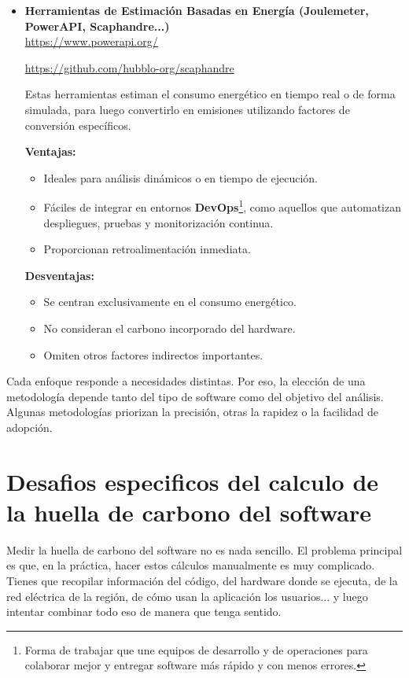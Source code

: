 \documentclass[12pt,a4paper]{report}
\begin{document}
\begin{itemize}
        \vspace{0.8em}

  \item \textbf{Herramientas de Estimación Basadas en Energía (Joulemeter, PowerAPI, Scaphandre...)} \\
        \href{https://www.powerapi.org/}{https://www.powerapi.org/}

        \href{https://github.com/hubblo-org/scaphandre}{https://github.com/hubblo-org/scaphandre}

        Estas herramientas estiman el consumo energético en tiempo real o de forma simulada, para luego convertirlo en emisiones utilizando factores de conversión específicos.

        \textbf{Ventajas:}
        \begin{itemize}
          \item Ideales para análisis dinámicos o en tiempo de ejecución.
          \item Fáciles de integrar en entornos \textbf{DevOps}\footnote{Forma de trabajar que une equipos de desarrollo y de operaciones para colaborar mejor y entregar software más rápido y con menos errores.}, como aquellos que automatizan despliegues, pruebas y monitorización continua.
          \item Proporcionan retroalimentación inmediata.
        \end{itemize}
        \textbf{Desventajas:}
        \begin{itemize}
          \item Se centran exclusivamente en el consumo energético.
          \item No consideran el carbono incorporado del hardware.
          \item Omiten otros factores indirectos importantes.
        \end{itemize}
\end{itemize}

Cada enfoque responde a necesidades distintas. Por eso, la elección de una metodología depende tanto del tipo de software como del objetivo del análisis. Algunas metodologías priorizan la precisión, otras la rapidez o la facilidad de adopción.

\section{Desafios especificos del calculo de la huella de carbono del software}

Medir la huella de carbono del software no es nada sencillo. El problema principal es que, en la práctica, hacer estos cálculos manualmente es muy complicado. Tienes que recopilar información del código, del hardware donde se ejecuta, de la red eléctrica de la región, de cómo usan la aplicación los usuarios... y luego intentar combinar todo eso de manera que tenga sentido.
\end{document}
